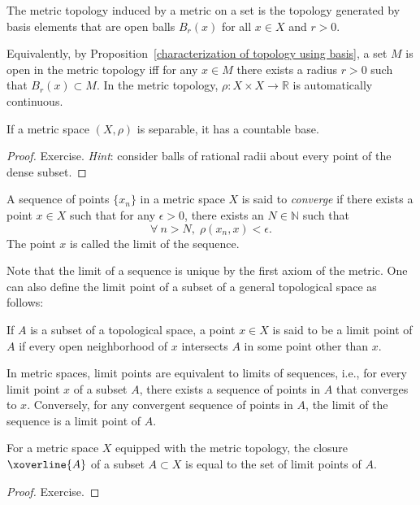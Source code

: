 \begin{defn}
    The metric topology induced by a metric on a set is the topology generated by basis elements that are open balls $B_r(x)$ for all $x\in X$ and $r>0$. 
\end{defn}
\begin{rem}
    Equivalently, by Proposition~\ref{characterization of topology using basis}, a set $M$ is open in the metric topology iff for any $x\in M$ there exists a radius $r>0$ such that $B_r(x)\subset M$. In the metric topology, $\rho:X\times X\to \mathbb R$ is automatically continuous.
\end{rem}
\begin{prop}
    If a metric space $(X,\rho)$ is separable, it has a countable base.
\end{prop}
\begin{proof}
    Exercise. \emph{Hint}: consider balls of rational radii about every point of the dense subset.
\end{proof}

\begin{defn}
    A sequence of points $\{x_n\}$ in a metric space $X$ is said to \emph{converge} if there exists a point $x\in X$ such that for any $\epsilon >0$, there exists an $N\in \mathbb{N}$ such that
    \begin{equation}
        \forall ~ n>N,\; \rho(x_n,x) < \epsilon.
    \end{equation}
    The point $x$ is called the limit of the sequence.
\end{defn}
Note that the limit of a sequence is unique by the first axiom of the metric. One can also define the limit point of a subset of a general topological space as follows:
\begin{defn}
    If $A$ is a subset of a topological space, a point $x\in X$ is said to be a limit point of $A$ if every open neighborhood of $x$ intersects $A$ in some point other than $x$.
\end{defn}

In metric spaces, limit points are equivalent to limits of sequences, i.e., for every limit point $x$ of a subset $A$, there exists a sequence of points in $A$ that converges to $x$. Conversely, for any convergent sequence of points in $A$, the limit of the sequence is a limit point of $A$.

\begin{prop}
    For a metric space $X$ equipped with the metric topology, the closure $\xoverline{A}$ of a subset $A\subset X$ is equal to the set of limit points of $A$.
\end{prop}
\begin{proof}
    Exercise.
\end{proof}

